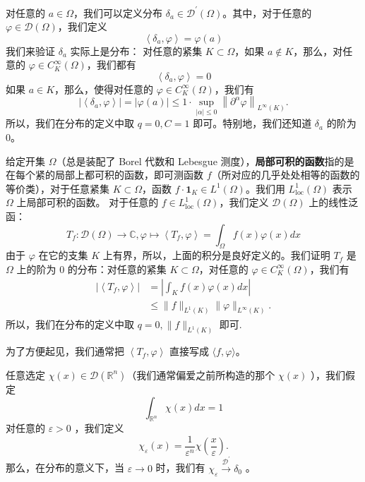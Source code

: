 \begin{example}
对任意的 $a \in \Omega$，我们可以定义分布 $\delta_a \in \mathcal{D}^{\prime}(\Omega)$。其中，对于任意的 $\varphi \in \mathcal{D}(\Omega)$，我们定义
\[
\left\langle\delta_a, \varphi\right\rangle=\varphi(a)
\]我们来验证 $\delta_a$ 实际上是分布：
对任意的紧集 $K \subset \Omega$，如果 $a \notin K$，那么，对任意的 $\varphi \in C_K^{\infty}(\Omega)$，我们都有
\[
\left\langle\delta_a, \varphi\right\rangle=0
\]如果 $a \in K$，那么，使得对任意的 $\varphi \in C_K^{\infty}(\Omega)$，我们有
\[
\left|\left\langle\delta_a, \varphi\right\rangle\right|=|\varphi(a)| \leqslant 1 \cdot \sup _{|\alpha| \leqslant 0}\left\|\partial^\alpha \varphi\right\|_{L^{\infty}(K)} .
\]所以，我们在分布的定义中取 $q=0, C=1$ 即可。特别地，我们还知道 $\delta_a$ 的阶为 0。
\end{example}
\begin{example}
给定开集 $\Omega$（总是装配了 Borel 代数和 Lebesgue 测度），\textbf{局部可积的函数}指的是在每个紧的局部上都可积的函数，即可测函数 $f$（所对应的几乎处处相等的函数的等价类），对于任意紧集 $K \subset \Omega$，函数 $f \cdot \mathbf{1}_K \in L^1(\Omega)$。我们用 $L_{\mathrm{loc}}^1(\Omega)$ 表示 $\Omega$ 上局部可积的函数。
对于任意的 $f \in L_{\mathrm{loc}}^1(\Omega)$，我们定义 $\mathcal{D}(\Omega)$ 上的线性泛函：
\[
T_f: \mathcal{D}(\Omega) \rightarrow \mathbb{C}, \varphi \mapsto\left\langle T_f, \varphi\right\rangle=\int_{\Omega} f(x) \varphi(x) d x
\]由于 $\varphi$ 在它的支集 $K$ 上有界，所以，上面的积分是良好定义的。我们证明 $T_f$ 是 $\Omega$ 上的阶为 0 的分布：对任意的紧集 $K \subset \Omega$，对任意的 $\varphi \in C_K^{\infty}(\Omega)$，我们有
\[
\begin{aligned}
\left|\left\langle T_f, \varphi\right\rangle\right| & =\left|\int_K f(x) \varphi(x) d x\right| \\
& \leqslant\|f\|_{L^1(K)}\|\varphi\|_{L^{\infty}(K)} .
\end{aligned}
\]所以，我们在分布的定义中取 $q=0,\|f\|_{L^1(K)}$ 即可.
\end{example}
\begin{remark}
为了方便起见，我们通常把 $\left\langle T_f, \varphi\right\rangle$ 直接写成 $\langle f, \varphi\rangle$。
\end{remark}
\begin{proposition}
任意选定 $\chi(x) \in \mathcal{D}\left(\mathbb{R}^n\right)$（我们通常偏爱之前所构造的那个 $\chi(x)$ ），我们假定
\[
\int_{\mathbb{R}^n} \chi(x) d x=1
\]对任意的 $\varepsilon>0$ ，我们定义
\[
\chi_{\varepsilon}(x)=\frac{1}{\varepsilon^n} \chi\left(\frac{x}{\varepsilon}\right) .
\]那么，在分布的意义下，当 $\varepsilon \rightarrow 0$ 时，我们有 $\chi_{\varepsilon} \xrightarrow{\mathcal{D}^{\prime}} \delta_0$ 。
\end{proposition}
